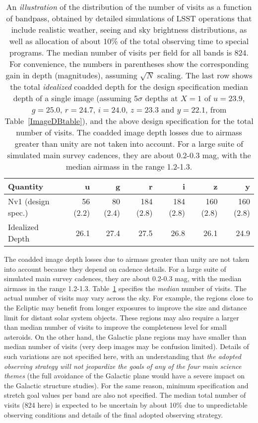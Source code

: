 \begin{table}[h]
\begin{tabular}{|l|r|r|r|r|r|r|}
\hline
   Quantity           &   u   &   g    &   r   &   i   &   z   &  y   \\
\hline
 Nv1 (design spec.)   &  56 (2.2) & 80 (2.4) &  184 (2.8) & 184 (2.8) & 160 (2.8) & 160 (2.8) \\
\hline
Idealized Depth         &    26.1   &    27.4  &     27.5   &  26.8     &   26.1    & 24.9  \\
\hline
\end{tabular}
\caption{An \textit{illustration} of the distribution of the number of visits as
a function of bandpass, obtained by detailed simulations of LSST operations
that include realistic weather, seeing and sky brightness distributions,
as well as allocation of about 10\% of the
total observing time to special programs. The median
number of visits per field for all bands is 824. For convenience, the numbers in
parentheses show the corresponding gain in depth (magnitudes), assuming
$\sqrt{N}$ scaling. The last row shows the total \textit{idealized} coadded
depth for the design specification median depth of a single image (assuming
5$\sigma$ depths at $X=1$ of $u=23.9$, $g=25.0$, $r=24.7$, $i=24.0$, $z=23.3$ and
$y=22.1$, from Table~\ref{ImageDBtable}), and the above design specification
for the total number of visits.  The coadded image depth losses due to airmass
greater than unity are not taken into account. For a large suite of simulated main survey
cadences, they are about 0.2-0.3 mag, with the median airmass in the range 1.2-1.3.
}
\label{TdepthCoadd}
\end{table}

The coadded image depth losses due to airmass greater than unity are not
taken into account because they depend on cadence details. For a large suite
of simulated main survey cadences, they are about 0.2-0.3 mag, with the median airmass in
the range 1.2-1.3.
Table~\ref{TdepthCoadd} specifies the \textit{median} number of visits. The actual
number of visits may vary across the sky. For example, the regions close to
the Ecliptic may benefit from longer exposures to improve the size and distance
limit for distant solar system objects. These regions may also require a
larger than median number of visits to improve
the completeness level for small asteroids. On the other hand, the Galactic
plane regions may have smaller than median number of visits (\eg very deep
images may be confusion limited). Details of such variations are not specified
here, with an understanding that \textit{the adopted observing strategy will not
jeopardize the goals of any of the four main science themes} (\eg the full
avoidance of the Galactic plane would have a severe impact on the Galactic
structure studies). For the same reason, minimum specification
and stretch goal values per band are also not specified. The median total number of visits
(824 here) is expected to be uncertain by about 10\% due to unpredictable
observing conditions and details of the final adopted observing strategy.



